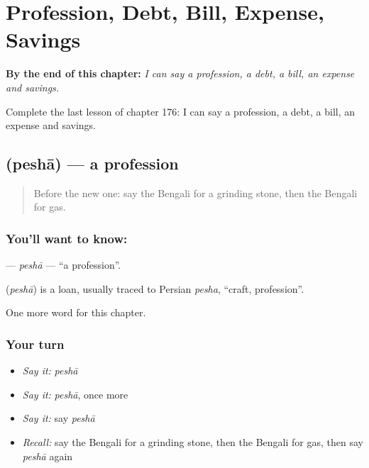 
\chapter{Profession, Debt, Bill, Expense, Savings}
\label{ch:bn-profession-debt-bill-expense-savings}

\begin{chapteropening}
\textbf{By the end of this chapter:} \emph{I can say a profession, a debt, a bill, an expense and savings.}

Complete the last lesson of chapter 176: I can say a profession, a debt, a bill, an expense and savings.
\end{chapteropening}

\section[\texorpdfstring{\bn{পেশা} (peshā)}{পেশা (peshā)}]{ (peshā) — a profession}

\label{lesson:BN-C176-pesha}



\begin{quote}
Before the new one: say the Bengali for a grinding stone, then the Bengali for gas.
\end{quote}

\subsection*{You'll want to know: }
\textbf{} — \emph{peshā} — \textquotedblleft{}a profession\textquotedblright{}.

\begin{cousinweb}
\textbf{} (\emph{peshā}) is a loan, usually traced to Persian \emph{pesha}, \textquotedblleft{}craft, profession\textquotedblright{}.
\end{cousinweb}

\begin{grammarlens}[title={What you've built}]
One more word for this chapter.
\end{grammarlens}

\subsection*{Your turn}
\begin{itemize}
\raggedright
  \item \emph{Say it:} \emph{peshā}
  \item \emph{Say it:} \emph{peshā}, once more
  \item \emph{Say it:} say \emph{peshā}
  \item \emph{Recall:} say the Bengali for a grinding stone, then the Bengali for gas, then say \emph{peshā} again
\end{itemize}


